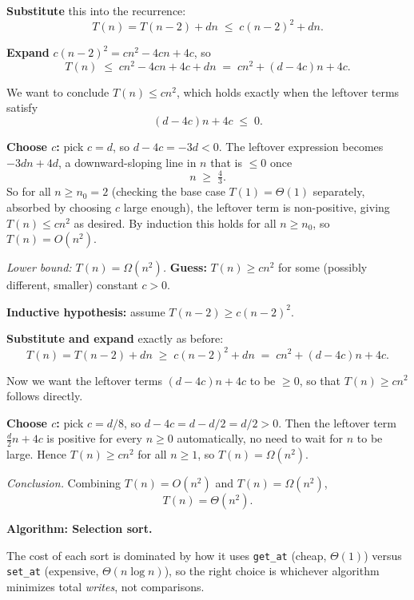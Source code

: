 \documentclass[12pt,twoside]{article}
\begin{document}
\begin{problems}
\begin{problemparts}
\textbf{Substitute} this into the recurrence:
\[
  T(n) = T(n-2) + dn \;\le\; c(n-2)^2 + dn.
\]

\textbf{Expand} $c(n-2)^2 = cn^2 - 4cn + 4c$, so
\[
  T(n) \;\le\; cn^2 - 4cn + 4c + dn \;=\; cn^2 + (d-4c)n + 4c.
\]

We want to conclude $T(n) \le cn^2$, which holds exactly when the leftover terms satisfy
\[
  (d-4c)n + 4c \;\le\; 0.
\]

\textbf{Choose $c$:} pick $c = d$, so $d - 4c = -3d < 0$. The leftover expression becomes
$-3dn + 4d$, a downward-sloping line in $n$ that is $\le 0$ once
\[
  n \;\ge\; \tfrac{4}{3}.
\]
So for all $n \ge n_0 = 2$ (checking the base case $T(1)=\Theta(1)$ separately, absorbed by
choosing $c$ large enough), the leftover term is non-positive, giving $T(n) \le cn^2$ as desired.
By induction this holds for all $n \ge n_0$, so $T(n) = O(n^2)$.

\textit{Lower bound: $T(n) = \Omega(n^2)$.}
\textbf{Guess:} $T(n) \ge cn^2$ for some (possibly different, smaller) constant $c>0$.

\textbf{Inductive hypothesis:} assume $T(n-2) \ge c(n-2)^2$.

\textbf{Substitute and expand} exactly as before:
\[
  T(n) = T(n-2) + dn \;\ge\; c(n-2)^2 + dn \;=\; cn^2 + (d-4c)n + 4c.
\]

Now we want the leftover terms $(d-4c)n + 4c$ to be $\ge 0$, so that $T(n) \ge cn^2$ follows
directly.

\textbf{Choose $c$:} pick $c = d/8$, so $d - 4c = d - d/2 = d/2 > 0$. Then the leftover term
$\tfrac{d}{2}n + 4c$ is positive for every $n \ge 0$ automatically, no need to wait for $n$ to
be large. Hence $T(n) \ge cn^2$ for all $n \ge 1$, so $T(n) = \Omega(n^2)$.

\textit{Conclusion.} Combining $T(n)=O(n^2)$ and $T(n)=\Omega(n^2)$,
\[
  \boxed{T(n) = \Theta(n^2).}
\]

\end{problemparts}

\newpage
\problem  %

\begin{problemparts}

\problempart

\textbf{Algorithm: Selection sort.}

The cost of each sort is dominated by how it uses \texttt{get\_at} (cheap, $\Theta(1)$) versus
\texttt{set\_at} (expensive, $\Theta(n\log n)$), so the right choice is whichever algorithm
minimizes total \emph{writes}, not comparisons.


\end{problemparts}
\end{problems}
\end{document}
